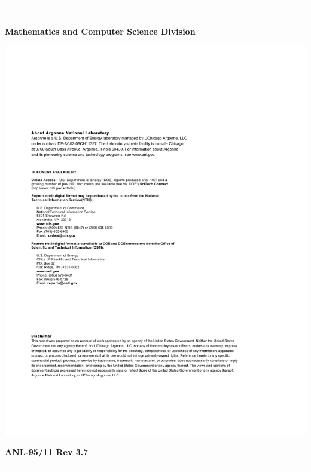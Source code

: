 \vspace*{3in}
\vspace*{8pt}
\hrule
\vspace*{8pt}

\vspace*{1in}
\noindent \\
{\Large {\bf Mathematics and Computer Science Division}}

\vspace*{10pt}


\vspace*{20pt}



\newpage
\centerline{\includegraphics{ArgonneReportTemplatePage2}}
\newpage

\hfill {\large {\bf ANL-95/11 Rev 3.7}}

\vspace*{3in}
\vspace*{8pt}
\hrule
\vspace*{8pt}

